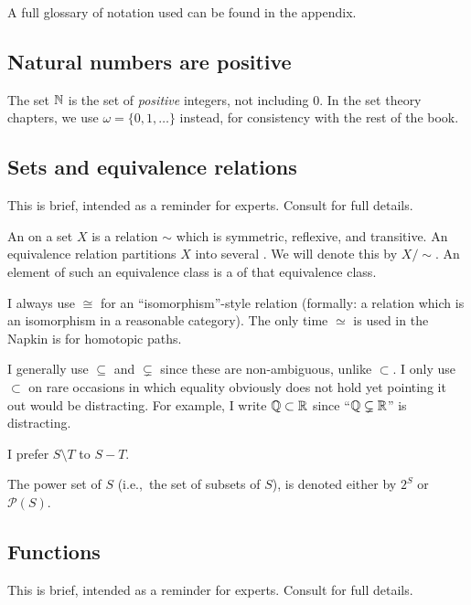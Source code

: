 A full glossary of notation used can be found in the appendix.

\subsection{Natural numbers are positive}
The set $\mathbb N$ is the set of \emph{positive} integers, not including $0$.
In the set theory chapters, we use $\omega = \{0, 1, \dots\}$
instead, for consistency with the rest of the book.

\subsection{Sets and equivalence relations}
This is brief, intended as a reminder for experts.
Consult  for full details.

An  on a set $X$ is a relation $\sim$
which is symmetric, reflexive, and transitive.
An equivalence relation partitions $X$
into several .
We will denote this by $X / {\sim}$.
An element of such an equivalence class is a
 of that equivalence class.

I always use $\cong$ for an ``isomorphism''-style relation
(formally: a relation which is an isomorphism in a reasonable category).
The only time $\simeq$ is used in the Napkin is for homotopic paths.

I generally use $\subseteq$ and $\subsetneq$ since these are non-ambiguous,
unlike $\subset$.  I only use $\subset$ on rare occasions in which equality
obviously does not hold yet pointing it out would be distracting.
For example, I write $\mathbb Q \subset \mathbb R$
since ``$\mathbb Q \subsetneq \mathbb R$'' is distracting.

I prefer $S \setminus T$ to $S - T$.

The power set of $S$ (i.e.,\ the set of subsets of $S$),
is denoted either by $2^S$ or $\mathcal P(S)$.

\subsection{Functions}
This is brief, intended as a reminder for experts.
Consult  for full details.

